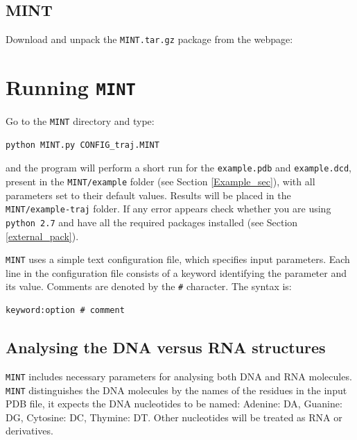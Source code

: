 \documentclass[12pt]{article}
\begin{document}
\subsection{MINT}
Download and unpack the {\tt MINT.tar.gz} package from the webpage:
\\


\section{Running {\tt MINT}}
Go to the {\tt MINT} directory and type:
\begin{verbatim}
python MINT.py CONFIG_traj.MINT
\end{verbatim}
and the program will perform a short run for the {\tt example.pdb} and {\tt example.dcd}, present in the {\tt MINT/example} folder (see Section \ref{Example_sec}), with all parameters set to their default values. Results will be placed in the {\tt MINT/example-traj} folder. If any error appears check whether you are using {\tt python 2.7} and have all the required packages installed (see Section \ref{external_pack}).

{\tt MINT} uses a simple text configuration file, which specifies input parameters. Each line in the configuration file consists of a keyword identifying the parameter and its value. Comments are denoted by the {\tt \#} character. The syntax is:
\begin{verbatim}
keyword:option # comment
\end{verbatim}


\subsection{Analysing the DNA versus RNA structures}
{\tt MINT} includes necessary parameters for analysing both DNA and RNA molecules. {\tt MINT} distinguishes the DNA molecules by the names of the residues in the input PDB file, it expects the DNA nucleotides to be named: Adenine: DA, Guanine: DG, Cytosine: DC, Thymine: DT. Other nucleotides will be treated as RNA or derivatives. 
\end{document}
